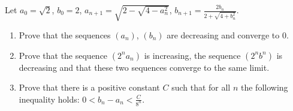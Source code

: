 \documentclass{article}
\begin{document}
\setlength{\parindent}{0pt}
Let $a_{0}=\sqrt{2}$, $b_{0}=2$, $a_{n+1}=\sqrt{2-\sqrt{4-a_{n}^{2}}}$, $b_{n+1}=\frac{2b_{n}}{2+\sqrt{4+b_{n}^{2}}}$.
\begin{enumerate}[label=\alph*)]
\item Prove that the sequences $(a_{n})$, $(b_{n})$ are decreasing and converge to $0$.
\item Prove that the sequence $(2^{n}a_{n})$ is increasing, the sequence $(2^{n}b^{n})$ is decreasing and that these two sequences converge to the same limit.
\item Prove that there is a positive constant $C$ such that for all $n$ the following inequality holds: $0<b_{n}-a_{n}<\frac{C}{8^{n}}$.
\end{enumerate}
\end{document}
